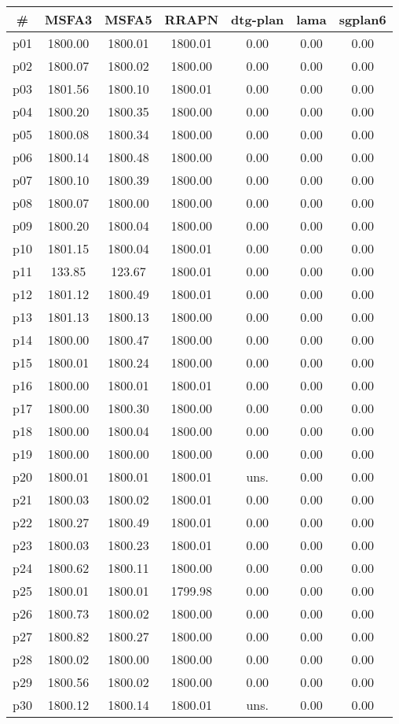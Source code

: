 \begin{tabular}{ccccccc}
\toprule
\textbf{\#} & \textbf{MSFA3} & \textbf{MSFA5} & \textbf{RRAPN} & \textbf{dtg-plan} & \textbf{lama} & \textbf{sgplan6}\\
\midrule
p01 & 1800.00 & 1800.01 & 1800.01 & 0.00 & 0.00 & 0.00\\
p02 & 1800.07 & 1800.02 & 1800.00 & 0.00 & 0.00 & 0.00\\
p03 & 1801.56 & 1800.10 & 1800.01 & 0.00 & 0.00 & 0.00\\
p04 & 1800.20 & 1800.35 & 1800.00 & 0.00 & 0.00 & 0.00\\
p05 & 1800.08 & 1800.34 & 1800.00 & 0.00 & 0.00 & 0.00\\
p06 & 1800.14 & 1800.48 & 1800.00 & 0.00 & 0.00 & 0.00\\
p07 & 1800.10 & 1800.39 & 1800.00 & 0.00 & 0.00 & 0.00\\
p08 & 1800.07 & 1800.00 & 1800.00 & 0.00 & 0.00 & 0.00\\
p09 & 1800.20 & 1800.04 & 1800.00 & 0.00 & 0.00 & 0.00\\
p10 & 1801.15 & 1800.04 & 1800.01 & 0.00 & 0.00 & 0.00\\
p11 & 133.85 & 123.67 & 1800.01 & 0.00 & 0.00 & 0.00\\
p12 & 1801.12 & 1800.49 & 1800.01 & 0.00 & 0.00 & 0.00\\
p13 & 1801.13 & 1800.13 & 1800.00 & 0.00 & 0.00 & 0.00\\
p14 & 1800.00 & 1800.47 & 1800.00 & 0.00 & 0.00 & 0.00\\
p15 & 1800.01 & 1800.24 & 1800.00 & 0.00 & 0.00 & 0.00\\
p16 & 1800.00 & 1800.01 & 1800.01 & 0.00 & 0.00 & 0.00\\
p17 & 1800.00 & 1800.30 & 1800.00 & 0.00 & 0.00 & 0.00\\
p18 & 1800.00 & 1800.04 & 1800.00 & 0.00 & 0.00 & 0.00\\
p19 & 1800.00 & 1800.00 & 1800.00 & 0.00 & 0.00 & 0.00\\
p20 & 1800.01 & 1800.01 & 1800.01 & uns. & 0.00 & 0.00\\
p21 & 1800.03 & 1800.02 & 1800.01 & 0.00 & 0.00 & 0.00\\
p22 & 1800.27 & 1800.49 & 1800.01 & 0.00 & 0.00 & 0.00\\
p23 & 1800.03 & 1800.23 & 1800.01 & 0.00 & 0.00 & 0.00\\
p24 & 1800.62 & 1800.11 & 1800.00 & 0.00 & 0.00 & 0.00\\
p25 & 1800.01 & 1800.01 & 1799.98 & 0.00 & 0.00 & 0.00\\
p26 & 1800.73 & 1800.02 & 1800.00 & 0.00 & 0.00 & 0.00\\
p27 & 1800.82 & 1800.27 & 1800.00 & 0.00 & 0.00 & 0.00\\
p28 & 1800.02 & 1800.00 & 1800.00 & 0.00 & 0.00 & 0.00\\
p29 & 1800.56 & 1800.02 & 1800.00 & 0.00 & 0.00 & 0.00\\
p30 & 1800.12 & 1800.14 & 1800.01 & uns. & 0.00 & 0.00\\
\bottomrule
\end{tabular}

